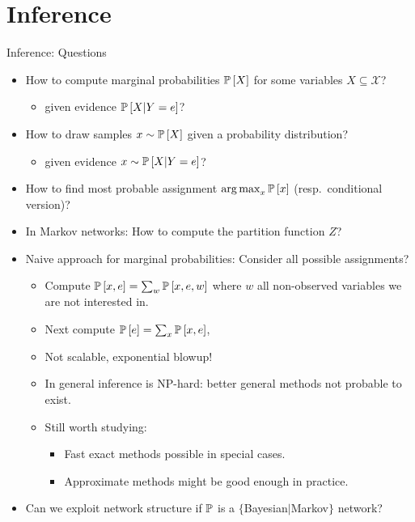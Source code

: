 \section{Inference}

\begin{frame}{Inference: Questions}
\begin{itemize}
\item How to compute marginal probabilities $\Pb[X]$ for some variables $X \subseteq \mathcal{X}$?
\begin{itemize}
    \pause \item given evidence $\Pb[X | Y = e]$?
\end{itemize}
\pause \item How to draw samples $x \sim \Pb[X]$ given a probability distribution?
\begin{itemize}
    \pause \item given evidence $x \sim \Pb[X | Y = e]$?
\end{itemize}
\pause \item How to find most probable assignment $\argmax_{x} \Pb[x]$ (resp.\ conditional version)?
\pause \item In Markov networks: How to compute the partition function $Z$?
\pause \item Naive approach for marginal probabilities: Consider all possible assignments? 
\begin{itemize}
\pause \item Compute $\Pb[x,e] = \sum_{w} \Pb[x,e,w]$ where $w$ all non-observed variables we are not interested in.
\pause \item Next compute $\Pb[e] = \sum_{x} \Pb[x,e]$,
\pause \item Not scalable, exponential blowup!
\pause \item In general inference is NP-hard: better general methods not probable to exist.
\pause \item Still worth studying: 
\begin{itemize}
    \item Fast exact methods possible in special cases.
    \pause \item Approximate methods might be good enough in practice.
\end{itemize}
\end{itemize}
\pause \item Can we exploit network structure if $\Pb$ is a $\{$Bayesian$|$Markov$\}$ network?
\end{itemize}
\end{frame}

